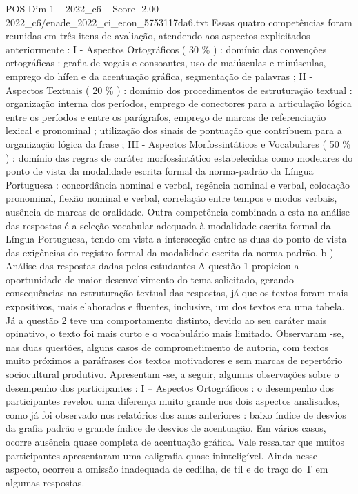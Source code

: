 \begin{textsample}{POS Dim 1 – 2022\_c6 – Score -2.00 – 2022\_c6/enade\_2022\_ci\_econ\_5753117da6.txt}
Essas quatro competências foram reunidas em três itens de avaliação, atendendo aos aspectos explicitados anteriormente : I - Aspectos Ortográficos ( 30 \% ) : domínio das convenções ortográficas : grafia de vogais e consoantes, uso de maiúsculas e minúsculas, emprego do hífen e da acentuação gráfica, segmentação de palavras ; II - Aspectos Textuais ( 20 \% ) : domínio dos procedimentos de estruturação textual : organização interna dos períodos, emprego de conectores para a articulação lógica entre os períodos e entre os parágrafos, emprego de marcas de referenciação lexical e pronominal ; utilização dos sinais de pontuação que contribuem para a organização lógica da frase ; III - Aspectos Morfossintáticos e Vocabulares ( 50 \% ) : domínio das regras de caráter morfossintático estabelecidas como modelares do ponto de vista da modalidade escrita formal da norma-padrão da Língua Portuguesa : concordância nominal e verbal, regência nominal e verbal, colocação pronominal, flexão nominal e verbal, correlação entre tempos e modos verbais, ausência de marcas de oralidade.
Outra competência combinada a esta na análise das respostas é a seleção vocabular adequada à modalidade escrita formal da Língua Portuguesa, tendo em vista a intersecção entre as duas do ponto de vista das exigências do registro formal da modalidade escrita da norma-padrão. b ) Análise das respostas dadas pelos estudantes A questão 1 propiciou a oportunidade de maior desenvolvimento do tema solicitado, gerando consequências na estruturação textual das respostas, já que os textos foram mais expositivos, mais elaborados e fluentes, inclusive, um dos textos era uma tabela.
Já a questão 2 teve um comportamento distinto, devido ao seu caráter mais opinativo, o texto foi mais curto e o vocabulário mais limitado.
Observaram -se, nas duas questões, alguns casos de comprometimento de autoria, com textos muito próximos a paráfrases dos textos motivadores e sem marcas de repertório sociocultural produtivo.
Apresentam -se, a seguir, algumas observações sobre o desempenho dos participantes : I – Aspectos Ortográficos : o desempenho dos participantes revelou uma diferença muito grande nos dois aspectos analisados, como já foi observado nos relatórios dos anos anteriores : baixo índice de desvios da grafia padrão e grande índice de desvios de acentuação.
Em vários casos, ocorre ausência quase completa de acentuação gráfica.
Vale ressaltar que muitos participantes apresentaram uma caligrafia quase ininteligível.
Ainda nesse aspecto, ocorreu a omissão inadequada de cedilha, de til e do traço do T em algumas respostas.

\end{textsample}
